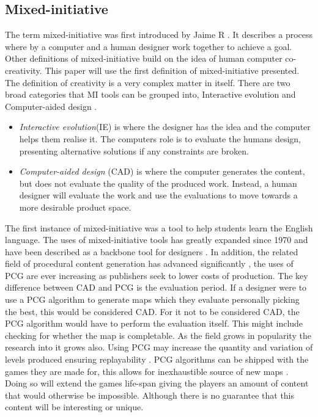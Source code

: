 \documentclass[journal]{IEEEtran}
\begin{document}
\subsection{Mixed-initiative} \label{MI}
The term mixed-initiative was first introduced by Jaime R \cite{carbonell1970mixed}.
It describes a process where by a computer and a human designer work together to achieve a goal. Other definitions of mixed-initiative build on the idea of human computer co-creativity. This paper will use the first definition of mixed-initiative  presented. The definition of creativity is a very complex matter in itself. 
There are two broad categories that MI tools can be grouped into, Interactive evolution and Computer-aided design \cite{liapis2016mixed}. 
\begin{itemize}
    \item \textit{Interactive evolution}(IE) is where the designer has the idea and the computer helps them realise it. The computers role is to evaluate the humans design, presenting alternative solutions if any constraints are broken. 
    
    \item \textit{Computer-aided design} (CAD) is where the computer generates the content, but does not evaluate the quality of the produced work. Instead, a human designer will evaluate the work and use the evaluations to move towards a more desirable product space.
\end{itemize}
The first instance of mixed-initiative was a tool to help students learn the English language. The uses of mixed-initiative tools has greatly expanded since 1970 and have been described as a backbone tool for designers \cite{alvarez2018fostering}. In addition, the related field of procedural content generation has advanced significantly \cite{van2013designing}, the uses of PCG are ever increasing as publishers seek to lower costs of production\cite{doherty2005mixed, font2016constrained}. The key difference between CAD and PCG is the evaluation period. If a designer were to use a PCG algorithm to generate maps which they evaluate personally picking the best, this would be considered CAD. For it not to be considered CAD, the PCG algorithm would have to perform the evaluation itself. This might include checking for whether the map is completable. 
As the field grows in popularity the research into it grows also. Using PCG may increase the quantity and variation of levels produced ensuring replayability \cite{karavolos2015mixed}. PCG algorithms can be shipped with the games they are made for, this allows for inexhaustible source of new maps \cite{johnson2010cellula}. Doing so will extend the games life-span giving the players an amount of content that would otherwise be impossible. Although there is no guarantee that this content will be interesting or unique.  
\end{document}
